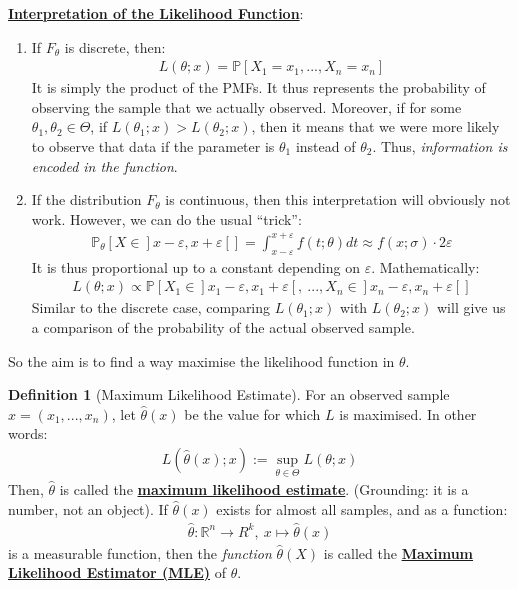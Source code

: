 \documentclass[11pt]{scrartcl}
\newcommand{\R}[0]{\mathbb{R}}
\theoremstyle{definition}
\newtheorem{definition}{Definition}
\theoremstyle{remark}
\newcommand{\dfn}[1]{\textbf{\underline{#1}}}
\newcommand{\pr}[1]{\mathbb{P}[#1]}
\newcommand{\idx}[2]{\int_{#1}^{#2}}
\begin{document}
\dfn{Interpretation of the Likelihood Function}: 
\begin{enumerate}[noitemsep]
	\item If $F_\theta$ is discrete, then: 
	\begin{align*}
		L(\theta; x) = \pr{X_1 = x_1, ..., X_n = x_n}	
	\end{align*}
	It is simply the product of the PMFs. It thus represents the probability of observing the sample that we actually observed. Moreover, if for some $\theta_1, \theta_2 \in \Theta$, if $L(\theta_1; x) > L(\theta_2; x)$, then it means that we were more likely to observe that data if the parameter is $\theta_1$ instead of $\theta_2$. Thus, \emph{information is encoded in the function}. 
	\item If the distribution $F_\theta$ is continuous, then this interpretation will obviously not work. However, we can do the usual ``trick'': 
	\begin{align*}
		\mathbb{P}_\theta [ X \in ]x - \varepsilon, x + \varepsilon [ ]  = \idx{x - \varepsilon}{x + \varepsilon} f (t; \theta) dt \approx f(x; \sigma) \cdot 2 \varepsilon	
	\end{align*}
	It is thus proportional up to a constant depending on $\varepsilon$. Mathematically: 
	\begin{align*}
		L(\theta; x) \propto \pr{X_1 \in ]x_1 - \varepsilon, x_1 + \varepsilon[,\ ..., X_n \in ]x_n - \varepsilon, x_n + \varepsilon [} 	
	\end{align*}
	Similar to the discrete case, comparing $L(\theta_1; x)$ with $L(\theta_2; x)$ will give us a comparison of the probability of the actual observed sample. 
\end{enumerate}
So the aim is to find a way maximise the likelihood function in $\theta$. 

\begin{definition}[Maximum Likelihood Estimate] 
	For an observed sample $x = (x_1, ..., x_n)$, let $\hat{\theta}(x)$ be the value for which $L$ is maximised. In other words: 
	\begin{align}
		L(\hat{\theta}(x); x) := \sup_{\theta \in \Theta} L(\theta; x) 
	\end{align}
	Then, $\hat{\theta}$ is called the \dfn{maximum likelihood estimate}. (Grounding: it is a number, not an object). If $\hat{\theta}(x)$ exists for almost all samples, and as a function: 
	\begin{align*}
		\hat{\theta}: \R^n \rightarrow R^k,\ x \mapsto \hat{\theta}(x) 	
	\end{align*}
	is a measurable function, then the \emph{function} $\hat{\theta}(X)$ is called the \dfn{Maximum Likelihood Estimator (MLE)} of $\theta$. 
\end{definition}
\end{document}
